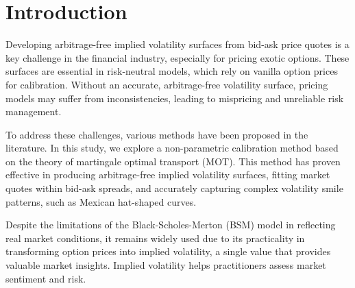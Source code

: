 \chapter{Introduction}
Developing arbitrage-free implied volatility surfaces from bid-ask price quotes is a key challenge in the financial industry, 
especially for pricing exotic options. These surfaces are essential in risk-neutral models, 
which rely on vanilla option prices for calibration. Without an accurate, arbitrage-free volatility surface, 
pricing models may suffer from inconsistencies, leading to mispricing and unreliable risk management.
\begin{comment}
Developing arbitrage-free implied volatility surfaces from bid-ask price quotes has been a longstanding challenge in the 
financial industry, particularly in the pricing of exotic options. These options rely on risk-neutral models, such as the 
local volatility and local stochastic volatility models, which are calibrated to vanilla option prices. Both models require 
accurate, arbitrage-free volatility surfaces to ensure precise pricing and effective risk management. These surfaces are 
crucial for avoiding inconsistencies that could lead to mispricing, preserving the integrity of risk-neutral probability 
measures, and maintaining stability in option pricing frameworks. Moreover, arbitrage-free surfaces provide reliable 
calculations of option sensitivities (Greeks), essential for constructing hedging strategies and managing financial risks. 
Additionally, they promote model stability by ensuring that simulations and calculations converge to meaningful results.
\end{comment}
To address these challenges, various methods have been proposed in the literature. In this study, we explore a non-parametric 
calibration method based on the theory of martingale optimal transport (MOT). This method has proven effective in producing 
arbitrage-free implied volatility surfaces, fitting market quotes within bid-ask spreads, 
and accurately capturing complex volatility smile patterns, such as Mexican hat-shaped curves. 

\vspace{.1in}
Despite the limitations of the Black-Scholes-Merton (BSM) model in reflecting real market conditions, 
it remains widely used due to its practicality in transforming option prices into implied volatility, 
a single value that provides valuable market insights. Implied volatility helps practitioners assess market sentiment and risk.

